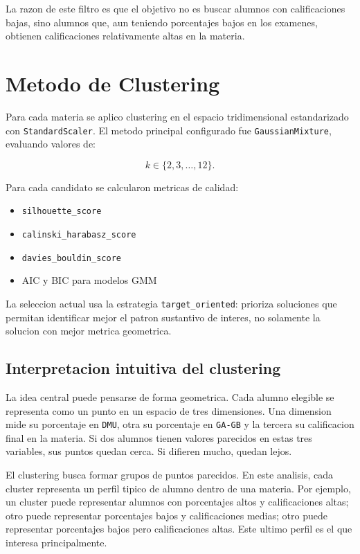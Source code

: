 \documentclass[11pt,letterpaper]{article}
\newcommand{\code}[1]{\texttt{#1}}
\begin{document}
La razon de este filtro es que el objetivo no es buscar alumnos con calificaciones bajas, sino alumnos que, aun teniendo porcentajes bajos en los examenes, obtienen calificaciones relativamente altas en la materia.

\section{Metodo de Clustering}

Para cada materia se aplico clustering en el espacio tridimensional estandarizado con \code{StandardScaler}. El metodo principal configurado fue \code{GaussianMixture}, evaluando valores de:

\[
k \in \{2,3,\ldots,12\}.
\]

Para cada candidato se calcularon metricas de calidad:

\begin{itemize}
    \item \code{silhouette\_score}
    \item \code{calinski\_harabasz\_score}
    \item \code{davies\_bouldin\_score}
    \item AIC y BIC para modelos GMM
\end{itemize}

La seleccion actual usa la estrategia \code{target\_oriented}: prioriza soluciones que permitan identificar mejor el patron sustantivo de interes, no solamente la solucion con mejor metrica geometrica.

\subsection{Interpretacion intuitiva del clustering}

La idea central puede pensarse de forma geometrica. Cada alumno elegible se representa como un punto en un espacio de tres dimensiones. Una dimension mide su porcentaje en \code{DMU}, otra su porcentaje en \code{GA-GB} y la tercera su calificacion final en la materia. Si dos alumnos tienen valores parecidos en estas tres variables, sus puntos quedan cerca. Si difieren mucho, quedan lejos.

El clustering busca formar grupos de puntos parecidos. En este analisis, cada cluster representa un perfil tipico de alumno dentro de una materia. Por ejemplo, un cluster puede representar alumnos con porcentajes altos y calificaciones altas; otro puede representar porcentajes bajos y calificaciones medias; otro puede representar porcentajes bajos pero calificaciones altas. Este ultimo perfil es el que interesa principalmente.
\end{document}

